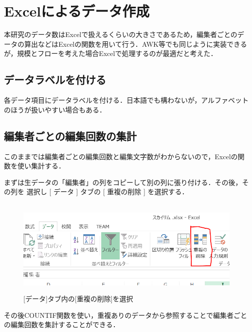 \newpage

\section{Excelによるデータ作成}

本研究のデータ数はExcelで扱えるくらいの大きさであるため，編集者ごとのデータの算出などはExcelの関数を用いて行う．AWK等でも同じように実装できるが，規模とフローを考えた場合Excelで処理するのが最適だと考えた．


\subsection{データラベルを付ける}

各データ項目にデータラベルを付ける．日本語でも構わないが，アルファベットのほうが扱いやすい場合もある．

\subsection{編集者ごとの編集回数の集計}

このままでは編集者ごとの編集回数と編集文字数がわからないので，Excelの関数を使い集計する．

まずは生データの「編集者」の列をコピーして別の列に張り付ける．その後，その列を
選択し [ データ ] タブの [ 重複の削除 ] を選択する．

\begin{figure}[htbp]
\centering　
\includegraphics[width=13cm]{tyouhuku.png}
\caption{[データ]タブ内の[重複の削除]を選択}
\end{figure}


その後COUNTIF関数を使い，重複ありのデータから参照することで編集者ごとの編集回数を集計することができる．

